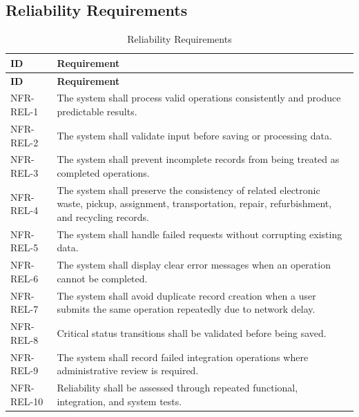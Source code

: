 \subsection{Reliability Requirements}
\begin{longtable}{@{}p{2.6cm}p{10.8cm}@{}}
\caption{Reliability Requirements} \label{tab:nfr-rel} \\
\toprule \textbf{ID} & \textbf{Requirement} \\ \midrule
\endfirsthead
\toprule \textbf{ID} & \textbf{Requirement} \\ \midrule
\endhead
NFR-REL-1 & The system shall process valid operations consistently and produce predictable results. \\
NFR-REL-2 & The system shall validate input before saving or processing data. \\
NFR-REL-3 & The system shall prevent incomplete records from being treated as completed operations. \\
NFR-REL-4 & The system shall preserve the consistency of related electronic waste, pickup, assignment, transportation, repair, refurbishment, and recycling records. \\
NFR-REL-5 & The system shall handle failed requests without corrupting existing data. \\
NFR-REL-6 & The system shall display clear error messages when an operation cannot be completed. \\
NFR-REL-7 & The system shall avoid duplicate record creation when a user submits the same operation repeatedly due to network delay. \\
NFR-REL-8 & Critical status transitions shall be validated before being saved. \\
NFR-REL-9 & The system shall record failed integration operations where administrative review is required. \\
NFR-REL-10 & Reliability shall be assessed through repeated functional, integration, and system tests. \\
\bottomrule
\end{longtable}

